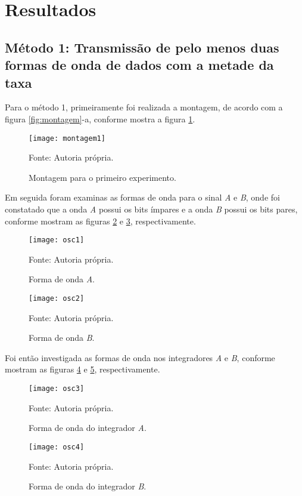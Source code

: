 \newpage
\section{Resultados}

\subsection{Método 1: Transmissão de pelo menos duas formas de onda de dados com a metade da taxa}

Para o método 1, primeiramente foi realizada a montagem, de acordo com a figura \ref{fig:montagem}-a, conforme mostra a figura \ref{fig:montagem1}.

\begin{figure}[H]
  \centering
  \caption{Montagem para o primeiro experimento.}
  \texttt{[image: montagem1]}
  
  \small Fonte: Autoria própria.
  \label{fig:montagem1}
\end{figure}

Em seguida foram examinas as formas de onda para o sinal \emph{A} e \emph{B}, onde foi constatado que a onda \emph{A} possui os bits ímpares e a onda \emph{B} possui os bits pares, conforme mostram as figuras \ref{fig:osc1} e \ref{fig:osc2}, respectivamente.

\begin{figure}[H]
  \centering
  \caption{Forma de onda \emph{A}.}
  \texttt{[image: osc1]}
  
  \small Fonte: Autoria própria.
  \label{fig:osc1}
\end{figure}

\begin{figure}[H]
  \centering
  \caption{Forma de onda \emph{B}.}
  \texttt{[image: osc2]}
  
  \small Fonte: Autoria própria.
  \label{fig:osc2}
\end{figure}

Foi então investigada as formas de onda nos integradores \emph{A} e \emph{B}, conforme mostram as figuras \ref{fig:osc3} e \ref{fig:osc4}, respectivamente.

\begin{figure}[H]
  \centering
  \caption{Forma de onda do integrador \emph{A}.}
  \texttt{[image: osc3]}
  
  \small Fonte: Autoria própria.
  \label{fig:osc3}
\end{figure}

\begin{figure}[H]
  \centering
  \caption{Forma de onda do integrador \emph{B}.}
  \texttt{[image: osc4]}
  
  \small Fonte: Autoria própria.
  \label{fig:osc4}
\end{figure}

